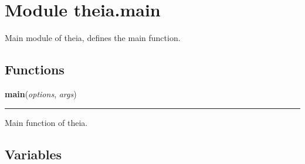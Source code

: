 %
%
%


\section{Module theia.main}

    \label{theia:main}
Main module of theia, defines the main function.



  \subsection{Functions}

    \label{theia:main:main}

    \vspace{0.5ex}

\hspace{.8\funcindent}\begin{boxedminipage}{\funcwidth}

    \raggedright \textbf{main}(\textit{options}, \textit{args})

    \vspace{-1.5ex}

    \rule{\textwidth}{0.5\fboxrule}
\setlength{\parskip}{2ex}
    Main function of theia.

\setlength{\parskip}{1ex}
    \end{boxedminipage}



  \subsection{Variables}

